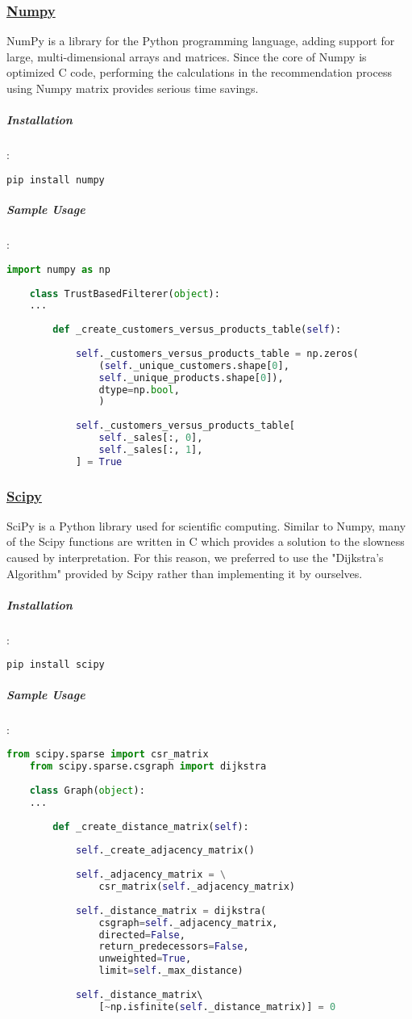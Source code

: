 	\subsubsection{\href{https://numpy.org/}{Numpy}}
	NumPy is a library for the Python programming language, adding support for large, multi-dimensional arrays and matrices. Since the core of Numpy is optimized C code, performing the calculations in the recommendation process using Numpy matrix provides serious time savings.
	\subparagraph{Installation}:
	\begin{lstlisting}[language=bash]
	pip install numpy
	\end{lstlisting}
	
	\subparagraph{Sample Usage}:
	\begin{lstlisting}[language=python, caption=Numpy example]
	import numpy as np
	
	class TrustBasedFilterer(object):
	...
	
		def _create_customers_versus_products_table(self):
	
			self._customers_versus_products_table = np.zeros(
				(self._unique_customers.shape[0],
				self._unique_products.shape[0]),
				dtype=np.bool,
				)
	
			self._customers_versus_products_table[
				self._sales[:, 0],
				self._sales[:, 1],
			] = True
	\end{lstlisting}
	
	\subsubsection{\href{https://www.scipy.org/}{Scipy}}
	SciPy is a Python library used for scientific computing. Similar to Numpy, many of the Scipy functions are written in C which provides a solution to the slowness caused by interpretation. For this reason, we preferred to use the "Dijkstra's Algorithm" provided by Scipy rather than implementing it by ourselves.
	\subparagraph{Installation}:
	\begin{lstlisting}[language=bash]
	pip install scipy
	\end{lstlisting}
	
	\subparagraph{Sample Usage}:
	\begin{lstlisting}[language=python, caption=Scipy example]
	from scipy.sparse import csr_matrix
	from scipy.sparse.csgraph import dijkstra
	
	class Graph(object):
	...
	
		def _create_distance_matrix(self):
	
			self._create_adjacency_matrix()
	
			self._adjacency_matrix = \
				csr_matrix(self._adjacency_matrix)
	
			self._distance_matrix = dijkstra( 
				csgraph=self._adjacency_matrix, 
				directed=False, 
				return_predecessors=False, 
				unweighted=True,
				limit=self._max_distance)
	
			self._distance_matrix\ 
				[~np.isfinite(self._distance_matrix)] = 0
	\end{lstlisting}
